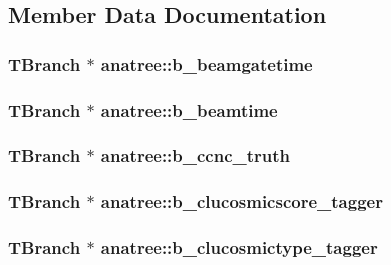 \subsection{Member Data Documentation}
\hypertarget{classanatree_a2361a4c9a52f77105efdc8a5a6474304}{
\subsubsection[{b\-\_\-beamgatetime}]{\setlength{\rightskip}{0pt plus 5cm}T\-Branch $\ast$ anatree\-::b\-\_\-beamgatetime}}\label{classanatree_a2361a4c9a52f77105efdc8a5a6474304}
\hypertarget{classanatree_a18b90820427fcba7bd774a8479a49c97}{
\subsubsection[{b\-\_\-beamtime}]{\setlength{\rightskip}{0pt plus 5cm}T\-Branch $\ast$ anatree\-::b\-\_\-beamtime}}\label{classanatree_a18b90820427fcba7bd774a8479a49c97}
\hypertarget{classanatree_a8c271e54ceb7cb3e262cfc008580b3d7}{
\subsubsection[{b\-\_\-ccnc\-\_\-truth}]{\setlength{\rightskip}{0pt plus 5cm}T\-Branch $\ast$ anatree\-::b\-\_\-ccnc\-\_\-truth}}\label{classanatree_a8c271e54ceb7cb3e262cfc008580b3d7}
\hypertarget{classanatree_a6b67c908760fa144f00052e85231ea2f}{
\subsubsection[{b\-\_\-clucosmicscore\-\_\-tagger}]{\setlength{\rightskip}{0pt plus 5cm}T\-Branch $\ast$ anatree\-::b\-\_\-clucosmicscore\-\_\-tagger}}\label{classanatree_a6b67c908760fa144f00052e85231ea2f}
\hypertarget{classanatree_a6275dc9d3c86fdf0c9dbafb7671b422b}{
\subsubsection[{b\-\_\-clucosmictype\-\_\-tagger}]{\setlength{\rightskip}{0pt plus 5cm}T\-Branch $\ast$ anatree\-::b\-\_\-clucosmictype\-\_\-tagger}}\label{classanatree_a6275dc9d3c86fdf0c9dbafb7671b422b}
